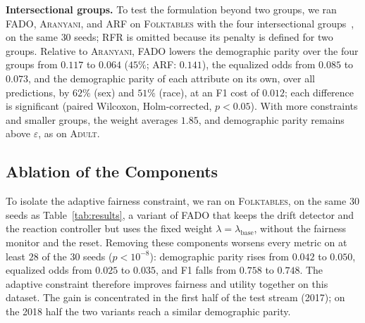 \documentclass[conference]{IEEEtran}
\newcommand{\fado}{\textsc{FADO}}
\newcommand{\ara}{\textsc{Aranyani}}
\newcommand{\arf}{\textsc{ARF}}
\newcommand{\rfr}{\textsc{RFR}}
\newcommand{\adult}{\textsc{Adult}}
\newcommand{\folk}{\textsc{Folktables}}
\newcommand{\rev}[1]{{\color{blue}#1}}
\renewcommand{\rev}[1]{#1}
\begin{document}
\rev{\textbf{Intersectional groups.} To test the formulation beyond two groups, we ran \fado{}, \ara{}, and \arf{} on \folk{} with the four intersectional groups~\cite{foulds2020intersectional},
on the same $30$ seeds; \rfr{} is omitted because its penalty is defined for two groups. Relative to \ara{}, \fado{} lowers the demographic parity over the four
groups from $0.117$ to $0.064$ ($45\%$; \arf{}: $0.141$), the equalized odds from $0.085$ to $0.073$, and the demographic parity of each attribute on its own,
over all predictions, by $62\%$ (sex) and $51\%$ (race), at an F1 cost of $0.012$; each difference is significant (paired Wilcoxon, Holm-corrected, $p<0.05$).
With more constraints and smaller groups, the weight averages $1.85$, and demographic parity remains above $\varepsilon$, as on \adult{}.}



\subsection{\rev{Ablation of the Components}}
\label{sec:results:ablation}
To isolate the adaptive fairness constraint, we ran on \folk{}, on the same $30$ seeds as Table~\ref{tab:results}, a variant of \fado{} that keeps the drift detector and the reaction controller but uses the fixed weight
$\lambda=\lambda_{\mathrm{base}}$, without the fairness monitor and the reset. Removing these components worsens every metric on at least $28$ of the $30$ seeds
($p<10^{-8}$): demographic parity rises from $0.042$ to $0.050$, equalized odds from $0.025$ to $0.035$, and F1 falls from $0.758$ to $0.748$. The adaptive
constraint therefore improves fairness and utility together on this dataset. The gain is concentrated in the first half of the test stream (2017); on the 2018 half the
two variants reach a similar demographic parity.
\end{document}
